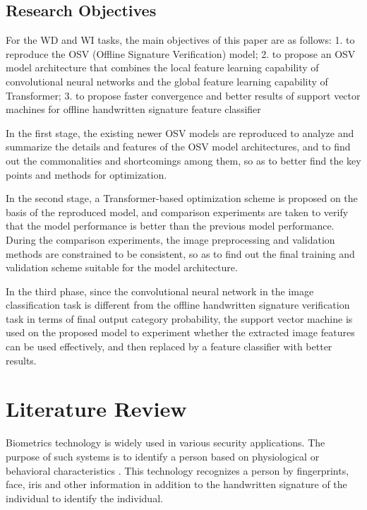 \documentclass{article}
\begin{document}
\subsection{Research Objectives}

For the WD and WI tasks, the main objectives of this paper are as follows: 1. to reproduce the OSV (Offline Signature Verification) model; 2. to propose an OSV model architecture that combines the local feature learning capability of convolutional neural networks and the global feature learning capability of Transformer; 3. to propose faster convergence and better results of support vector machines for offline handwritten signature feature classifier

In the first stage, the existing newer OSV models are reproduced to analyze and summarize the details and features of the OSV model architectures, and to find out the commonalities and shortcomings among them, so as to better find the key points and methods for optimization.

In the second stage, a Transformer-based optimization scheme is proposed on the basis of the reproduced model, and comparison experiments are taken to verify that the model performance is better than the previous model performance. During the comparison experiments, the image preprocessing and validation methods are constrained to be consistent, so as to find out the final training and validation scheme suitable for the model architecture.

In the third phase, since the convolutional neural network in the image classification task is different from the offline handwritten signature verification task in terms of final output category probability, the support vector machine is used on the proposed model to experiment whether the extracted image features can be used effectively, and then replaced by a feature classifier with better results.


\newpage
\section{Literature Review}

Biometrics technology is widely used in various security applications. The purpose of such systems is to identify a person based on physiological or behavioral characteristics \cite{1}. This technology recognizes a person by fingerprints, face, iris and other information in addition to the handwritten signature of the individual to identify the individual.
\end{document}
